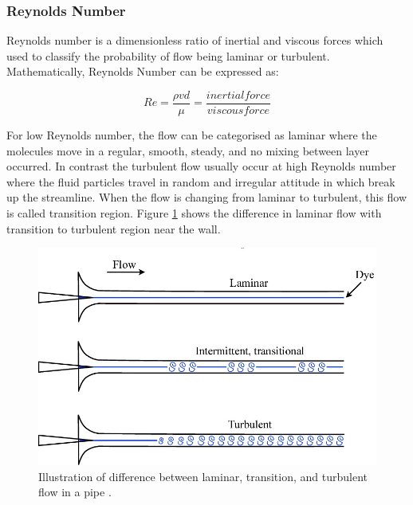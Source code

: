 \subsubsection{Reynolds Number}
Reynolds number is a dimensionless ratio of inertial and viscous forces which used to classify the probability of flow being laminar or turbulent\cite{Rehm2008SituationalMPD}. Mathematically, Reynolds Number can be expressed as:

\begin{equation}
Re = \frac{\rho v d}{\mu} = \frac{inertial force}{viscous force}
\end{equation}

\noindent For low Reynolds number, the flow can be categorised as laminar where the molecules move in a regular, smooth, steady, and no mixing between layer occurred\cite{Obidi2014TheoryVehicles}. In contrast the turbulent flow usually occur at high Reynolds number where the fluid particles travel in random and irregular attitude in which break up the streamline. When the flow is changing from laminar to turbulent, this flow is called transition region. Figure \ref{fig:2} shows the difference in laminar flow with transition to turbulent region near the wall. 

\begin{figure}[!htb]
    \centering
    \includegraphics[scale=0.4]{Figures/laminar_turbulent_difference.jpg}
    \caption{Illustration of difference between laminar, transition, and turbulent flow in a pipe \cite{D.BARKLE2016TheoreticalPipe}.}
    \label{fig:2}
\end{figure}

